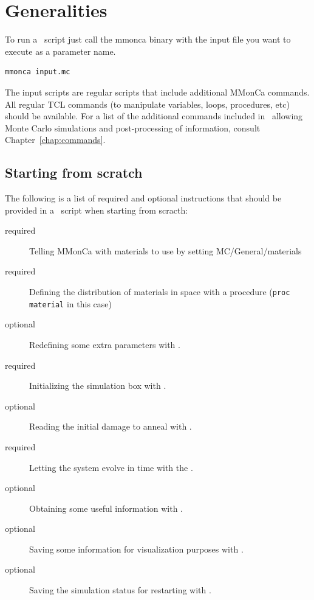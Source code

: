 \section{Generalities}

To run a \MMonCa\ script just call the {\param mmonca} binary with the input file you want to execute as a parameter name.

\begin{lstlisting}
mmonca input.mc
\end{lstlisting}

The input scripts are regular  scripts that include additional MMonCa commands. All regular TCL commands (to manipulate variables, loops, procedures, etc) should be available. For a list of the additional commands included in \MMonCa\ allowing Monte Carlo simulations and post-processing of information, consult Chapter~\ref{chap:commands}.

\subsection{Starting from scratch}

The following is a list of required and optional instructions that should be provided in a \MMonCa\ script when starting from scracth:

\begin{description}
\item [required] Telling MMonCa with materials to use by setting {\param MC/General/materials}
\item [required] Defining the distribution of materials in space with a procedure ({\tt proc material} in this case)
\item [optional] Redefining some extra parameters with .
\item [required] Initializing the simulation box with .
\item [optional] Reading the initial damage to anneal with .
\item [required] Letting the system evolve in time with the .
\item [optional] Obtaining some useful information with .
\item [optional] Saving some information for visualization purposes with .
\item [optional] Saving the simulation status for restarting with .
\end{description}

